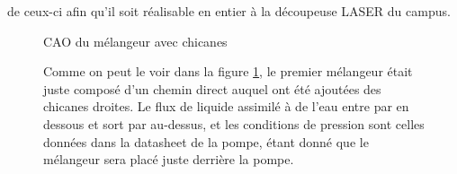 \documentclass[a4paper, 11pt]{article}
\begin{document}
de ceux-ci afin qu'il soit réalisable en entier à la découpeuse LASER du campus.
\newline
\begin{multicols}{2}
    \begin{figure}[H]
        \centering
        \caption{CAO du mélangeur avec chicanes}
        \label{fig:CAO_prototype_melangeur}
    \end{figure}
    \begin{figure}[H]
        Comme on peut le voir dans la figure \ref{fig:CAO_prototype_melangeur}, le premier mélangeur était 
        juste composé d'un chemin direct auquel ont été ajoutées des chicanes droites.
        Le flux de liquide assimilé à de l'eau entre par en dessous et sort par au-dessus, 
        et les conditions de pression sont celles données dans la datasheet de la pompe, étant donné 
        que le mélangeur sera placé juste derrière la pompe.
    \end{figure}
\end{multicols}
\newpage
\end{document}
